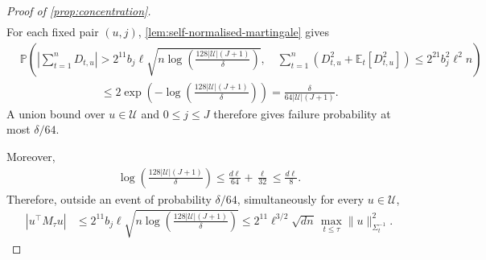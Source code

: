 \documentclass[11pt]{article}
\newcommand{\E}{\mathbb E}
\newcommand{\Pp}{\mathbb P}
\newcommand{\1}{\mathbf 1}
\begin{document}
\begin{proof}[Proof of \cref{prop:concentration}]
\begin{align}
    \end{align}
    For each fixed pair $(u,j)$,
    \cref{lem:self-normalised-martingale} gives
    \begin{align}
         & \Pp\left(
        \left|\sum_{t=1}^nD_{t,u}\right|
        >
        2^{11}b_j\ell
        \sqrt{
            n\log\left(
            \frac{128|\mathcal U|(J+1)}{\delta}
            \right)
        },
        \quad
        \sum_{t=1}^n
        \left(
        D_{t,u}^2+\E_t[D_{t,u}^2]
        \right)
        \leq
        2^{21}b_j^2\ell^2n
        \right)
        \\
         & \hspace{3cm}\leq
        2\exp\left(
        -\log\left(
            \frac{128|\mathcal U|(J+1)}{\delta}
            \right)
        \right)
        =
        \frac{\delta}{64|\mathcal U|(J+1)}.
    \end{align}
    A union bound over $u\in\mathcal U$ and $0\leq j\leq J$
    therefore gives failure probability at most $\delta/64$.

    Moreover,
    \begin{align}
        \log\left(
        \frac{128|\mathcal U|(J+1)}{\delta}
        \right)
        \leq
        \frac{d\ell}{64}
        +
        \frac{\ell}{32}
        \leq
        \frac{d\ell}{8}.
    \end{align}
    Therefore, outside an event of probability $\delta/64$,
    simultaneously for every $u\in\mathcal U$,
    \begin{align}
        |u^\top M_\tau u|
         & \leq
        2^{11}b_j\ell
        \sqrt{
            n\log\left(
            \frac{128|\mathcal U|(J+1)}{\delta}
            \right)
        }
        \leq
        2^{11}\ell^{3/2}\sqrt{dn}\,
        \max_{t\leq\tau}\|u\|_{\Sigma_t^{-1}}^2.
        \label{eq:H-net}
    \end{align}


\end{proof}
\end{document}
